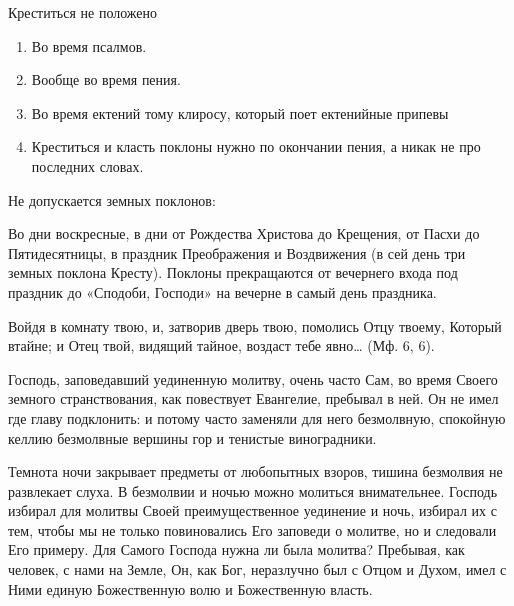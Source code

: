 \bfseries 


Креститься не положено


\normalfont{}

\begin{enumerate}


\item Во время псалмов.

\item Вообще во время пения.

\item Во время ектений тому клиросу, который поет ектенийные припевы

\item Креститься и класть поклоны нужно по окончании пения, а никак не про последних словах.


\end{enumerate}





\bfseries 


Не допускается земных поклонов:


\normalfont{}


Во дни воскресные, в дни от Рождества Христова до Крещения, от Пасхи до Пятидесятницы, в праздник Преображения и Воздвижения (в сей день три земных поклона Кресту). Поклоны прекращаются от вечернего входа под праздник до «Сподоби, Господи» на вечерне в самый день праздника.





\mychapterending

\label{chap:text147}
 


Войдя в комнату твою, и, затворив дверь твою, помолись Отцу твоему, Который втайне; и Отец твой, видящий тайное, воздаст тебе явно… (Мф. 6, 6).

Господь, заповедавший уединенную молитву, очень часто Сам, во время Своего земного странствования, как повествует Евангелие, пребывал в ней. Он не имел где главу подклонить: и потому часто заменяли для него безмолвную, спокойную келлию безмолвные вершины гор и тенистые виноградники.

Темнота ночи закрывает предметы от любопытных взоров, тишина безмолвия не развлекает слуха. В безмолвии и ночью можно молиться внимательнее. Господь избирал для молитвы Своей преимущественное уединение и ночь, избирал их с тем, чтобы мы не только повиновались Его заповеди о молитве, но и следовали Его примеру. Для Самого Господа нужна ли была молитва? Пребывая, как человек, с нами на Земле, Он, как Бог, неразлучно был с Отцом и Духом, имел с Ними единую Божественную волю и Божественную власть.

